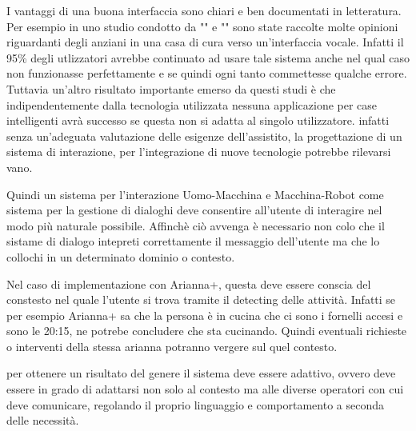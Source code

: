 \documentclass{thesisreport}
\begin{document}
 I vantaggi di una buona interfaccia sono chiari e ben documentati in letteratura. 
 Per esempio in uno studio condotto da "" e "" sono state raccolte molte opinioni riguardanti degli anziani in una casa di cura verso un'interfaccia vocale. Infatti il 95\% degli utlizzatori avrebbe continuato ad usare tale sistema anche nel qual caso non funzionasse perfettamente e se quindi ogni tanto commettesse qualche errore. 
 Tuttavia un'altro risultato importante emerso da questi studi è che indipendentemente dalla tecnologia utilizzata nessuna applicazione per case intelligenti avrà successo se questa non si adatta al singolo utilizzatore. 
 infatti senza un'adeguata valutazione delle esigenze dell'assistito, la progettazione di un sistema di interazione, per l'integrazione di nuove tecnologie potrebbe rilevarsi vano. 
 
 Quindi un sistema per l'interazione Uomo-Macchina e Macchina-Robot come sistema per la gestione di dialoghi deve consentire all'utente di interagire nel modo più naturale possibile. Affinchè ciò avvenga è necessario non colo che il sistame di dialogo intepreti correttamente il messaggio dell'utente ma che lo collochi in un determinato dominio o contesto. 
 
 Nel caso di implementazione con Arianna+, questa deve essere conscia del constesto nel quale l'utente si trova tramite il detecting delle attività. Infatti se per esempio Arianna+ sa che la persona è in cucina che ci sono i fornelli accesi e sono le 20:15, ne potrebe concludere che sta cucinando. Quindi eventuali richieste o interventi della stessa arianna potranno vergere sul quel contesto. 
 
 per ottenere un risultato del genere il sistema deve essere adattivo, ovvero deve essere in grado di adattarsi non solo al contesto ma alle diverse operatori con cui deve comunicare, regolando il proprio linguaggio e comportamento a seconda delle necessità. 
 
\end{document}
